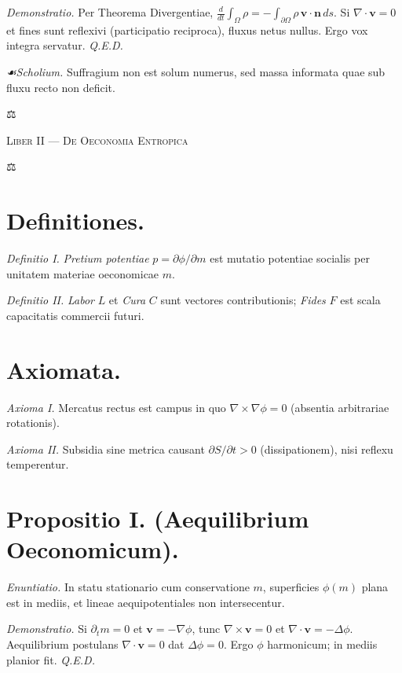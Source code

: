 \documentclass[12pt]{article}
\newcommand{\justitia}{\centerline{\Large ⚖}}
\newcommand{\scholia}{\textit{☙\;}}
\newcommand{\divider}{\vspace{1em}\justitia\vspace{1em}}
\newcommand{\Liber}[1]{\vspace{1ex}\begin{center}\Large\textsc{Liber #1}\end{center}\vspace{-0.5ex}\justitia\vspace{0.5ex}}
\begin{document}
\textit{Demonstratio.} Per Theorema Divergentiae, \(\frac{d}{dt}\int_{\Omega}\rho = -\int_{\partial \Omega} \rho\, \mathbf{v}\cdot \mathbf{n}\, ds\). Si \(\nabla\cdot \mathbf{v}=0\) et fines sunt reflexivi (participatio reciproca), fluxus netus nullus. Ergo vox integra servatur. \textit{Q.E.D.}

\textit{\scholia Scholium.} Suffragium non est solum numerus, sed massa informata quae sub fluxu recto non deficit.

\divider

\Liber{II — De Oeconomia Entropica}

\section*{Definitiones.}

\textit{Definitio I.} \; \textit{Pretium potentiae} \(p=\partial \phi/\partial m\) est mutatio potentiae socialis per unitatem materiae oeconomicae \(m\).

\textit{Definitio II.} \; \textit{Labor} \(L\) et \textit{Cura} \(C\) sunt vectores contributionis; \textit{Fides} \(F\) est scala capacitatis commercii futuri.

\section*{Axiomata.}

\textit{Axioma I.} \; Mercatus rectus est campus in quo \(\nabla \times \nabla \phi = 0\) (absentia arbitrariae rotationis).

\textit{Axioma II.} \; Subsidia sine metrica causant \(\partial S/\partial t > 0\) (dissipationem), nisi reflexu temperentur.

\section*{Propositio I. \; (Aequilibrium Oeconomicum).}

\textit{Enuntiatio.} \; In statu stationario cum conservatione \(m\), superficies \(\phi(m)\) plana est in mediis, et lineae aequipotentiales non intersecentur.

\textit{Demonstratio.} Si \(\partial_t m=0\) et \(\mathbf{v}=-\nabla \phi\), tunc \(\nabla \times \mathbf{v}=0\) et \(\nabla\cdot \mathbf{v} = -\Delta \phi\). Aequilibrium postulans \(\nabla\cdot \mathbf{v}=0\) dat \(\Delta \phi=0\). Ergo \(\phi\) harmonicum; in mediis planior fit. \textit{Q.E.D.}
\end{document}
